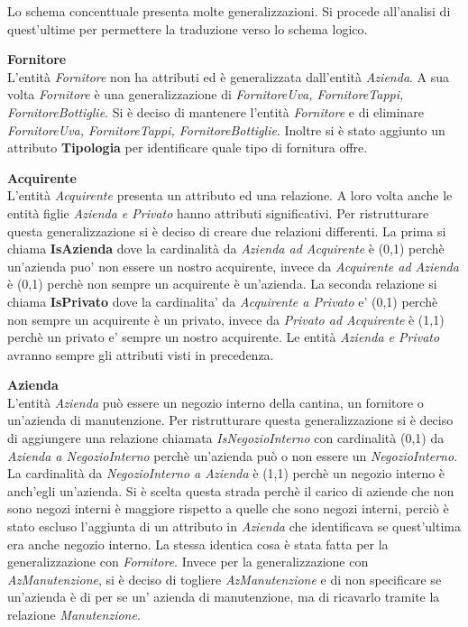 Lo schema concenttuale presenta molte generalizzazioni. Si procede all'analisi di quest'ultime per permettere la traduzione verso lo schema logico.\\

\begin{flushleft}
	\textbf{\large{Fornitore}}\\
	L'entità \emph{Fornitore} non ha attributi ed è generalizzata dall'entità \emph{Azienda}. A sua volta \emph{Fornitore} è una generalizzazione di \emph{FornitoreUva, FornitoreTappi, FornitoreBottiglie}. Si è deciso di mantenere l'entità \emph{Fornitore} e di eliminare \emph{FornitoreUva, FornitoreTappi, FornitoreBottiglie}. Inoltre si è stato aggiunto un attributo \textbf{Tipologia} per identificare quale tipo di fornitura offre.
\end{flushleft}


\begin{flushleft}
	\textbf{\large{Acquirente}}\\
	L'entità \emph{Acquirente} presenta un attributo ed una relazione. A loro volta anche le entità figlie \emph{Azienda e Privato} hanno attributi significativi. Per ristrutturare questa generalizzazione si è deciso di creare due relazioni differenti. La prima si chiama \textbf{IsAzienda} dove la cardinalità da \emph{Azienda ad Acquirente} è (0,1) perchè un'azienda puo' non essere un nostro acquirente, invece da \emph{Acquirente ad Azienda} è (0,1) perchè non sempre un acquirente è un'azienda.
	La seconda relazione si chiama \textbf{IsPrivato} dove la cardinalita' da \emph{Acquirente a Privato} e' (0,1) perchè non sempre un acquirente è un privato, invece da \emph{Privato ad Acquirente} è (1,1) perchè un privato e' sempre un nostro acquirente. Le entità \emph{Azienda e Privato} avranno sempre gli attributi visti in precedenza.
\end{flushleft}

\begin{flushleft}
	\textbf{\large{Azienda}}\\
	L'entità \emph{Azienda} può essere un negozio interno della cantina, un fornitore o un'azienda di manutenzione. Per ristrutturare questa generalizzazione si è deciso di aggiungere una relazione chiamata \emph{IsNegozioInterno} con cardinalità (0,1) da \emph{Azienda a NegozioInterno} perchè un'azienda può o non essere un \emph{NegozioInterno}. La cardinalità da \emph{NegozioInterno a Azienda} è (1,1) perchè un negozio interno è anch'egli un'azienda. Si è scelta questa strada perchè il carico di aziende che non sono negozi interni è maggiore rispetto a quelle che sono negozi interni, perciò è stato escluso l'aggiunta di un attributo in \emph{Azienda} che identificava se quest'ultima era anche negozio interno. La stessa identica cosa è stata fatta per la generalizzazione con \emph{Fornitore}. Invece per la generalizzazione con \emph{AzManutenzione}, si è deciso di togliere \emph{AzManutenzione} e di non specificare se un'azienda è di per se un' azienda di manutenzione, ma di ricavarlo tramite la relazione \emph{Manutenzione}.
\end{flushleft}

